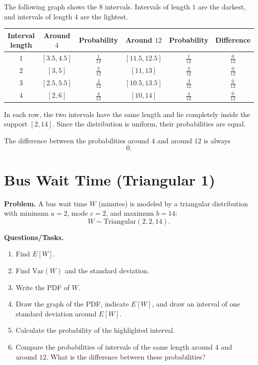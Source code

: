 \begin{enumerate}[label=\textbf{\alph*)}]
	The following graph shows the \(8\) intervals. Intervals of length \(1\) are the darkest, and intervals of length \(4\) are the lightest.
	
	
	\begin{center}
		\begin{tabular}{c c c c c c}
			\hline
			Interval length & Around \(4\) & Probability & Around \(12\) & Probability & Difference \\
			\hline
			\(1\) & \([3.5,4.5]\) & \(\frac{1}{12}\) & \([11.5,12.5]\) & \(\frac{1}{12}\) & \(\frac{0}{12}\) \\
			\(2\) & \([3,5]\) & \(\frac{2}{12}\) & \([11,13]\) & \(\frac{2}{12}\) & \(\frac{0}{12}\) \\
			\(3\) & \([2.5,5.5]\) & \(\frac{3}{12}\) & \([10.5,13.5]\) & \(\frac{3}{12}\) & \(\frac{0}{12}\) \\
			\(4\) & \([2,6]\) & \(\frac{4}{12}\) & \([10,14]\) & \(\frac{4}{12}\) & \(\frac{0}{12}\) \\
			\hline
		\end{tabular}
	\end{center}
	
	In each row, the two intervals have the same length and lie completely inside the support \([2,14]\). Since the distribution is uniform, their probabilities are equal.
	
	The difference between the probabilities around \(4\) and around \(12\) is always
	\[
	0.
	\]
	
\end{enumerate}

\section{Bus Wait Time (Triangular 1)}

\textbf{Problem.}
A bus wait time \(W\) (minutes) is modeled by a triangular distribution with minimum \(a=2\), mode \(c=2\), and maximum \(b=14\):
\[
W\sim \text{Triangular}(2,2,14).
\]

\textbf{Questions/Tasks.}
\begin{enumerate}[label=\textbf{\alph*)}]
	\item Find \(E[W]\).
	\item Find \(\mathrm{Var}(W)\) and the standard deviation.
	\item Write the PDF of \(W\).
	\item Draw the graph of the PDF, indicate \(E[W]\), and draw an interval of one standard deviation around \(E[W]\).
	\item Calculate the probability of the highlighted interval.
	\item Compare the probabilities of intervals of the same length around \(4\) and around \(12\). What is the difference between these probabilities?
\end{enumerate}

